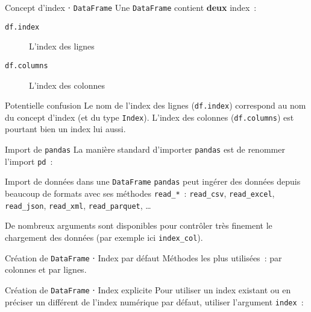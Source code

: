 \begin{frame}{Concept d'index ⋅ \texttt{DataFrame}}
  Une \texttt{DataFrame} contient \textbf{deux} index~:
  \begin{description}
    \item[\texttt{df.index}] L'index des lignes
    \item[\texttt{df.columns}] L'index des colonnes
  \end{description}


  \begin{alertblock}{Potentielle confusion}
    Le nom de l'index des lignes (\texttt{df.index}) correspond au nom du concept d'index (et du type \texttt{Index}).
    L'index des colonnes (\texttt{df.columns}) est pourtant bien un index lui aussi.
  \end{alertblock}
\end{frame}

\begin{frame}{Import de \texttt{pandas}}
  La manière standard d'importer \texttt{pandas} est de renommer l'import \texttt{pd}~:
\end{frame}

\begin{frame}{Import de données dans une \texttt{DataFrame}}
  \texttt{pandas} peut ingérer des données depuis beaucoup de formats avec ses méthodes \texttt{read\_*}~: \texttt{read\_csv}, \texttt{read\_excel}, \texttt{read\_json}, \texttt{read\_xml}, \texttt{read\_parquet}, …


  De nombreux arguments sont disponibles pour contrôler très finement le chargement des données (par exemple ici \texttt{index\_col}).
\end{frame}

\begin{frame}{Création de \texttt{DataFrame} ⋅ Index par défaut}
  Méthodes les plus utilisées~: par colonnes et par lignes.

\end{frame}

\begin{frame}{Création de \texttt{DataFrame} ⋅ Index explicite}
  Pour utiliser un index existant ou en préciser un différent de l'index numérique par défaut, utiliser l'argument \texttt{index}~:

\end{frame}


